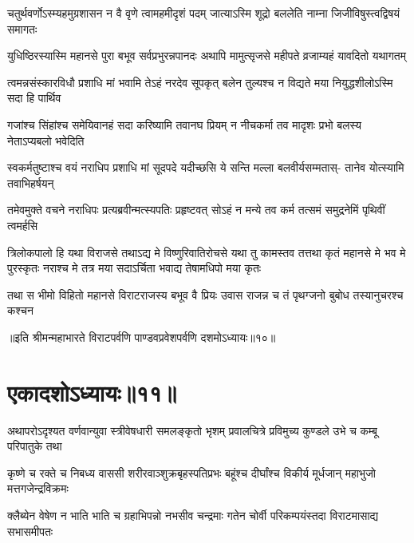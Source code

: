 


\fourlineindentedshloka
{चतुर्थवर्णोऽस्म्यहमुग्रशासन}
{न वै वृणे त्वामहमीदृशं पदम्}
{जात्याऽस्मि शूद्रो बललेति नाम्ना}
{जिजीविषुस्त्वद्विषयं समागतः}


\fourlineindentedshloka
{युधिष्ठिरस्यास्मि महानसे पुरा}
{बभूव सर्वप्रभुरन्नपानदः}
{अथापि मामुत्सृजसे महीपते}
{व्रजाम्यहं यावदितो यथागतम्}


\fourlineindentedshloka
{त्वमन्नसंस्कारविधौ प्रशाधि मां}
{भवामि तेऽहं नरदेव सूपकृत्}
{बलेन तुल्यश्च न विद्यते मया}
{नियुद्धशीलोऽस्मि सदा हि पार्थिव}


\fourlineindentedshloka
{गजांश्च सिंहांश्च समेयिवानहं}
{सदा करिष्यामि तवानघ प्रियम्}
{न नीचकर्मा तव मादृशः प्रभो}
{बलस्य नेताऽप्यबलो भवेदिति}


\fourlineindentedshloka
{स्वकर्मतुष्टाश्च वयं नराधिप}
{प्रशाधि मां सूदपदे यदीच्छसि}
{ये सन्ति मल्ला बलवीर्यसम्मतास्-}
{तानेव योत्स्यामि तवाभिहर्षयन्}



\fourlineindentedshloka
{तमेवमुक्ते वचने नराधिपः}
{प्रत्यब्रवीन्मत्स्यपतिः प्रहृष्टवत्}
{सोऽहं न मन्ये तव कर्म तत्समं}
{समुद्रनेमिं पृथिवीं त्वमर्हसि}


\sixlineindentedshloka
{त्रिलोकपालो हि यथा विराजसे}
{तथाऽद्य मे विष्णुरिवातिरोचसे}
{यथा तु कामस्तव तत्तथा कृतं}
{महानसे मे भव मे पुरस्कृतः}
{नराश्च मे तत्र मया सदाऽर्चिता}
{भवाद्य तेषामधिपो मया कृतः}


\fourlineindentedshloka
{तथा स भीमो विहितो महानसे}
{विराटराजस्य बभूव वै प्रियः}
{उवास राजन्न च तं पृथग्जनो}
{बुबोध तस्यानुचरश्च कश्चन}

॥इति श्रीमन्महाभारते विराटपर्वणि पाण्डवप्रवेशपर्वणि दशमोऽध्यायः॥१०॥

\chapter{एकादशोऽध्यायः॥११॥}

\fourlineindentedshloka
{अथापरोऽदृश्यत वर्णवान्युवा}
{स्त्रीवेषधारी समलङ्कृतो भृशम्}
{प्रवालचित्रे प्रविमुच्य कुण्डले}
{उभे च कम्बू परिपातुके तथा}


\fourlineindentedshloka
{कृष्णे च रक्ते च निबध्य वाससी}
{शरीरवाञ्शुक्रबृहस्पतिप्रभः}
{बहूंश्च दीर्घांश्च विकीर्य मूर्धजान्}
{महाभुजो मत्तगजेन्द्रविक्रमः}


\fourlineindentedshloka
{क्लैब्येन वेषेण न भाति भाति च}
{ग्रहाभिपन्नो नभसीव चन्द्रमाः}
{गतेन चोर्वी परिकम्पयंस्तदा}
{विराटमासाद्य सभासमीपतः}



